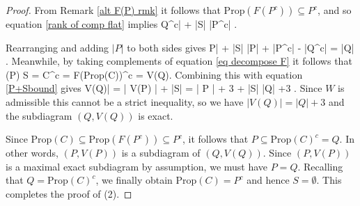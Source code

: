 \documentclass[11pt]{article}
\newcommand{\rk}{\textrm{rk} }
\def\ba #1\ea{\begin{align} #1 \end{align}}
\def\bas #1\eas{\begin{align*} #1 \end{align*}}
\newcommand{\Prop}{\textrm{Prop}}
\theoremstyle{remark}
\theoremstyle{definition}
\begin{document}
\begin{proof}
From Remark \ref{alt F(P) rmk} it follows that $\Prop (F(P^c)) \subseteq P^c$, and so equation \eqref{rank of comp flat} implies \bas |Q^c| + |S| \leq |P^c|  \;.\eas 

Rearranging and adding $|P|$ to both sides gives \ba |P| + |S| \leq |P| + |P^c| - |Q^c| = |Q| \;.\label{P+Sbound}\ea 
Meanwhile, by taking complements of equation \eqref{eq decompose F} it follows that
\bas V(P) \sqcup S = C^c = F(\Prop(C))^c  = V(Q)\;. \eas
Combining this with equation \eqref{P+Sbound} gives 
\ba |V(Q)| = | V(P) | + |S| = | P | + 3 + |S| \leq |Q| +3 \;. \label{Q defines exact}\ea
Since $W$ is admissible this cannot be a strict inequality, so we have $|V(Q)| = |Q| +3$ and the subdiagram $(Q, V(Q))$ is exact.

Since $\Prop(C) \subseteq \Prop(F(P^c)) \subseteq P^c$, it follows that $P \subseteq \Prop(C)^c = Q$. In other words, $(P, V(P))$ is a subdiagram of $(Q, V(Q))$. Since $(P, V(P))$ is a maximal exact subdiagram by assumption, we must have $P=Q$. Recalling that $Q = \Prop(C)^c$, we finally obtain $\Prop (C) = P^c$ and hence $S = \emptyset$. This completes the proof of (2).
%
%
%

\end{proof}
\end{document}
